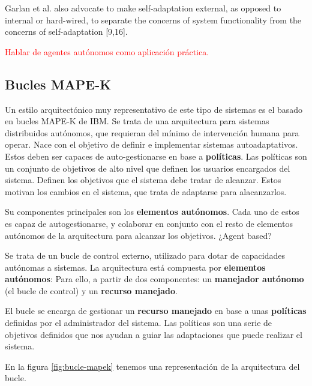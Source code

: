 Garlan et al. also advocate to make self-adaptation external, as opposed to internal or hard-wired, to separate the concerns of system
functionality from the concerns of self-adaptation [9,16].

\textcolor{red}{Hablar de agentes autónomos como aplicación práctica. \cite{savaglioAgentbasedInternetThings2020}}

\subsection{Bucles MAPE-K}

Un estilo arquitectónico muy representativo de este tipo de sistemas es el basado en bucles MAPE-K \cite{ibmcorporationArchitecturalBlueprintAutonomic2006, fonsServiciosAdaptivereadyPara2021} de IBM. Se trata de una arquitectura para sistemas distribuidos autónomos, que requieran del mínimo de intervención humana para operar. Nace con el objetivo de definir e implementar sistemas autoadaptativos. Estos deben ser capaces de auto-gestionarse en base a \textbf{políticas}. Las políticas son un conjunto de objetivos de alto nivel que definen los usuarios encargados del sistema. Definen los objetivos que el sistema debe tratar de alcanzar. Estos motivan los cambios en el sistema, que trata de adaptarse para alacanzarlos.

Su componentes principales son los \textbf{elementos autónomos}. Cada uno de estos es capaz de autogestionarse, y colaborar en conjunto con el resto de elementos autónomos de la arquitectura para alcanzar los objetivos. ¿Agent based?


Se trata de un bucle de control externo, utilizado para dotar de capacidades autónomas a sistemas. La arquitectura está compuesta por \textbf{elementos autónomos}: Para ello, a partir de dos componentes: un \textbf{manejador autónomo} (el bucle de control) y un \textbf{recurso manejado}.

El bucle se encarga de gestionar un \textbf{recurso manejado} en base a unas \textbf{políticas} definidas por el administrador del sistema. Las políticas son una serie de objetivos definidos que nos ayudan a guiar las adaptaciones que puede realizar el sistema.

En la figura \ref{fig:bucle-mapek} tenemos una representación de la arquitectura del bucle.

